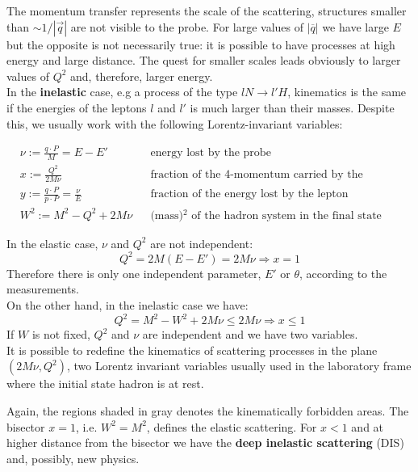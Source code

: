 \documentclass[10.75pt,a4paper,openright,bottom=2cm]{article}
\begin{document}
The momentum transfer represents the scale of the scattering, structures smaller than $\sim1/|\Vec{q}|$ are not visible to the probe. For large values of $|\overline{q}|$ we have large $E$ but the opposite is not necessarily true: it is possible to have processes at high energy and large distance. The quest for smaller scales leads obviously to larger values of $Q^2$ and, therefore, larger energy.\\
In the \textbf{inelastic} case, e.g a process of the type $lN\to l'H$, kinematics is the same if the energies of the leptons $l$ and $l'$ is much larger than their masses. Despite this, we usually work with the following Lorentz-invariant variables:
\begin{tcolorbox}[width=\textwidth,colback={yellow!50},title={Lorentz-Invariant Variables},colbacktitle={gray!50},coltitle=black]
\[
\begin{aligned}
&\nu:=\frac{q\cdot P}{M}=E-E' &&\text{energy lost by the probe}\\
&x:=\frac{Q^2}{2M\nu} &&\text{fraction of the 4-momentum carried by the interacting parton}\\
&y:=\frac{q\cdot P}{p\cdot P}=\frac{\nu}{E} &&\text{fraction of the energy lost by the lepton}\\
&W^2:=M^2-Q^2+2M\nu &&\text{(mass)$^2$ of the hadron system in the final state}
\end{aligned}
\]
\end{tcolorbox}
\noindent
In the elastic case, $\nu$ and $Q^2$ are not independent:
\[
Q^2=2M(E-E')=2M\nu\Rightarrow x=1
\]
Therefore there is only one independent parameter, $E'$ or $\theta$, according to the measurements.\\
On the other hand, in the inelastic case we have:
\[
Q^2=M^2-W^2+2M\nu\le2M\nu\Rightarrow x\le1
\]
If $W$ is not fixed, $Q^2$ and $\nu$ are independent and we have two variables.\\
It is possible to redefine the kinematics of scattering processes in the plane $(2M\nu,Q^2)$, two Lorentz invariant variables usually used in the laboratory frame where the initial state hadron is at rest.\\
\begin{center}
\end{center}
Again, the regions shaded in gray denotes the kinematically forbidden areas. The bisector $x=1$, i.e. $W^2=M^2$, defines the elastic scattering. For $x<1$ and at higher distance from the bisector we have the \textbf{deep inelastic scattering} (DIS) and, possibly, new physics.
\end{document}
